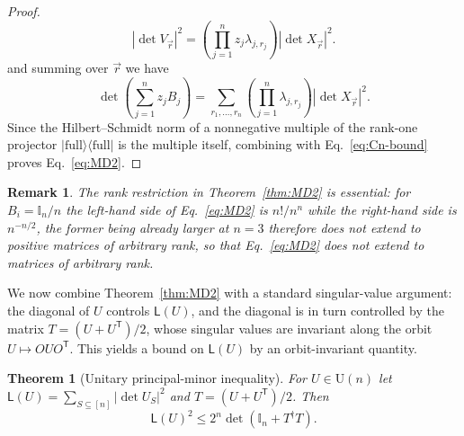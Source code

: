 \documentclass[prx,twocolumn,superscriptaddress,aps,10pt, frontmatterverbose, reprint,footinbib,longbibliography=true]{revtex4-2}
\newtheorem{theorem}{Theorem}
\newtheorem{remark}{Remark}
\newcommand{\trans}{\mathsf{T}}
\begin{document}
\begin{proof}
\begin{equation}
    |\det V_{\vec r}|^2
=
\left(\prod_{j=1}^n z_j\lambda_{j,r_j}\right)
|\det X_{\vec r}|^2.
\end{equation}
and summing over $\vec{r}$ we have
\begin{equation}
    [z_1\cdots z_n]\det\!\left(\sum_{j=1}^n z_jB_j\right)
=
\sum_{r_1,\ldots,r_n}
\left(\prod_{j=1}^n\lambda_{j,r_j}\right)
|\det X_{\vec r}|^2.
\end{equation}
Since the Hilbert--Schmidt norm of a nonnegative multiple of the rank-one projector $|\mathrm{full}\rangle\langle\mathrm{full}|$ is the multiple itself, combining with Eq.~\eqref{eq:Cn-bound} proves Eq.~\eqref{eq:MD2}. \end{proof}

\begin{remark}
The rank restriction in Theorem~\ref{thm:MD2} is essential: for $B_i=\mathbb{I}_n/n$ the left-hand side of Eq.~\eqref{eq:MD2} is $n!/n^n$ while the right-hand side is $n^{-n/2}$, the former being already larger at $n=3$ therefore does not extend to positive matrices of arbitrary rank, so that Eq.~\eqref{eq:MD2} does not extend to matrices of arbitrary rank.\end{remark}

We now combine Theorem~\ref{thm:MD2} with a standard singular-value argument: the diagonal of $U$ controls $\mathsf{L}(U)$, and the diagonal is in turn controlled by the matrix $T=(U+U^{\trans})/2$, whose singular values are invariant along the orbit $U\mapsto OUO^{\trans}$. This yields a bound on $\mathsf{L}(U)$ by an orbit-invariant quantity.

\begin{theorem}[Unitary principal-minor inequality]
\label{thm:UL}
For $U\in \mathrm{U}(n)$ let $\mathsf{L}(U)=\sum_{S\subseteq[n]}|\det U_S|^2$ and $T=(U+U^{\trans})/2$. Then
\begin{equation}
    \mathsf{L}(U)^2\le 2^n\det\!\left(\mathbb{I}_n+T^\dagger T\right).
    \label{eq:UL}
\end{equation}
\end{theorem}
\end{document}
